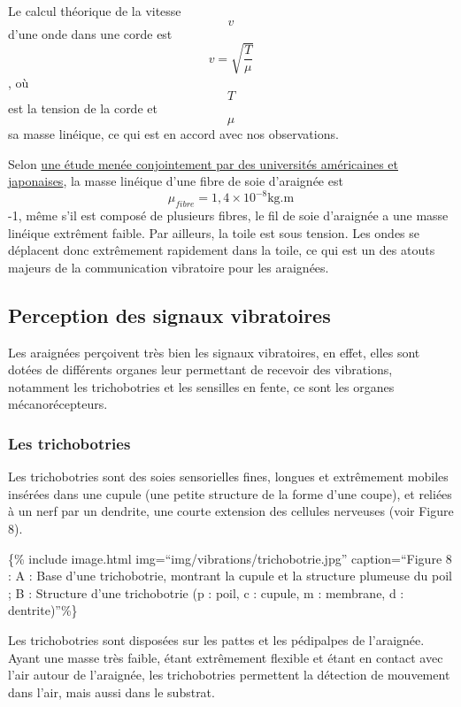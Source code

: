 Le calcul théorique de la vitesse \[v\] d'une onde dans une corde est
\[v = \sqrt{\frac{T}{\mu}}\], où \[T\] est la tension de la corde et
\[\mu\] sa masse linéique, ce qui est en accord avec nos observations.

Selon
\href{http://web.mit.edu/course/3/3.064/www/slides/Ko_spider_silk.pdf}{une
étude menée conjointement par des universités américaines et
japonaises}, la masse linéique d'une fibre de soie d'araignée est
\[\mu_{fibre} = 1,4\times10^{-8} \text{kg.m}\]-1, même s'il est composé
de plusieurs fibres, le fil de soie d'araignée a une masse linéique
extrêment faible. Par ailleurs, la toile est sous tension. Les ondes se
déplacent donc extrêmement rapidement dans la toile, ce qui est un des
atouts majeurs de la communication vibratoire pour les araignées.

\subsection{Perception des signaux
vibratoires}\label{perception-des-signaux-vibratoires}

Les araignées perçoivent très bien les signaux vibratoires, en effet,
elles sont dotées de différents organes leur permettant de recevoir des
vibrations, notamment les trichobotries et les sensilles en fente, ce
sont les organes mécanorécepteurs.

\subsubsection{Les trichobotries}\label{les-trichobotries}

Les trichobotries sont des soies sensorielles fines, longues et
extrêmement mobiles insérées dans une cupule (une petite structure de la
forme d'une coupe), et reliées à un nerf par un dendrite, une courte
extension des cellules nerveuses (voir Figure 8).

\{\% include image.html img=``img/vibrations/trichobotrie.jpg''
caption=``Figure 8 : A : Base d'une trichobotrie, montrant la cupule et
la structure plumeuse du poil ; B : Structure d'une trichobotrie (p :
poil, c : cupule, m : membrane, d : dentrite)''\%\}

Les trichobotries sont disposées sur les pattes et les pédipalpes de
l'araignée. Ayant une masse très faible, étant extrêmement flexible et
étant en contact avec l'air autour de l'araignée, les trichobotries
permettent la détection de mouvement dans l'air, mais aussi dans le
substrat.

